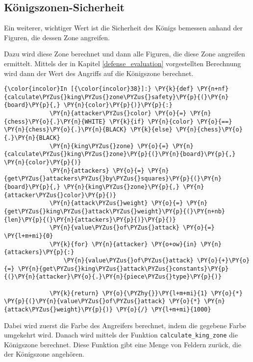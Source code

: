     \subsection{Königszonen-Sicherheit}\label{kuxf6nigszonen-sicherheit}

Ein weiterer, wichtiger Wert ist die Sicherheit des Königs bemessen anhand der Figuren, die dessen Zone angreifen.

Dazu wird diese Zone berechnet und dann alle Figuren, die diese Zone
angreifen ermittelt. Mittels der in Kapitel \ref{defense_evaluation} vorgestellten
Berechnung wird dann der Wert des Angriffs auf die Königszone berechnet.

        \begin{Verbatim}[commandchars=\\\{\}]
{\color{incolor}In [{\color{incolor}38}]:} \PY{k}{def} \PY{n+nf}{calculate\PYZus{}king\PYZus{}zone\PYZus{}safety}\PY{p}{(}\PY{n}{board}\PY{p}{,} \PY{n}{color}\PY{p}{)}\PY{p}{:}
             \PY{n}{attacker\PYZus{}color} \PY{o}{=} \PY{n}{chess}\PY{o}{.}\PY{n}{WHITE} \PY{k}{if} \PY{n}{color} \PY{o}{==} \PY{n}{chess}\PY{o}{.}\PY{n}{BLACK} \PY{k}{else} \PY{n}{chess}\PY{o}{.}\PY{n}{BLACK}
             \PY{n}{king\PYZus{}zone} \PY{o}{=} \PY{n}{calculate\PYZus{}king\PYZus{}zone}\PY{p}{(}\PY{n}{board}\PY{p}{,} \PY{n}{color}\PY{p}{)}
             \PY{n}{attackers} \PY{o}{=} \PY{n}{get\PYZus{}attackers\PYZus{}by\PYZus{}squares}\PY{p}{(}\PY{n}{board}\PY{p}{,} \PY{n}{king\PYZus{}zone}\PY{p}{,} \PY{n}{attacker\PYZus{}color}\PY{p}{)}
             \PY{n}{attack\PYZus{}weight} \PY{o}{=} \PY{n}{get\PYZus{}king\PYZus{}attack\PYZus{}weight}\PY{p}{(}\PY{n+nb}{len}\PY{p}{(}\PY{n}{attackers}\PY{p}{)}\PY{p}{)}
             \PY{n}{value\PYZus{}of\PYZus{}attack} \PY{o}{=} \PY{l+m+mi}{0}
             \PY{k}{for} \PY{n}{attacker} \PY{o+ow}{in} \PY{n}{attackers}\PY{p}{:}
                 \PY{n}{value\PYZus{}of\PYZus{}attack} \PY{o}{+}\PY{o}{=} \PY{n}{get\PYZus{}king\PYZus{}attack\PYZus{}constants}\PY{p}{(}\PY{n}{attacker}\PY{o}{.}\PY{n}{piece\PYZus{}type}\PY{p}{)}
             
             \PY{k}{return} \PY{o}{\PYZhy{}}\PY{l+m+mi}{1} \PY{o}{*} \PY{p}{(}\PY{n}{value\PYZus{}of\PYZus{}attack} \PY{o}{*} \PY{n}{attack\PYZus{}weight}\PY{p}{)} \PY{o}{/} \PY{l+m+mi}{1000}
\end{Verbatim}

    Dabei wird zuerst die Farbe des Angreifers berechnet, indem die gegebene
Farbe umgekehrt wird. Danach wird mittels der Funktion
\texttt{calculate\_king\_zone} die Königszone berechnet. Diese Funktion
gibt eine Menge von Feldern zurück, die der Königszone angehören.

